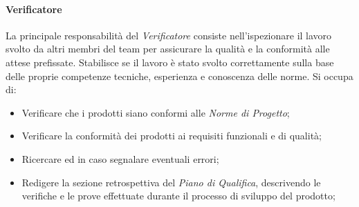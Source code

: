 \documentclass{article}
\begin{document}
\paragraph{Verificatore}\label{verificatore} La principale responsabilità del \textit{Verificatore} consiste nell'ispezionare il lavoro svolto da altri membri del team per assicurare la qualità e la conformità alle attese prefissate. Stabilisce se il lavoro è stato svolto correttamente sulla base delle proprie competenze tecniche, esperienza e conoscenza delle norme. Si occupa di:
\begin{itemize}
    \item Verificare che i prodotti siano conformi alle \textit{Norme di Progetto};
    \item Verificare la conformità dei prodotti ai requisiti funzionali e di qualità;
    \item Ricercare ed in caso segnalare eventuali errori;
    \item Redigere la sezione retrospettiva del \textit{Piano di Qualifica}, descrivendo le verifiche e le prove effettuate durante il processo di sviluppo del prodotto;
\end{itemize}
\end{document}
